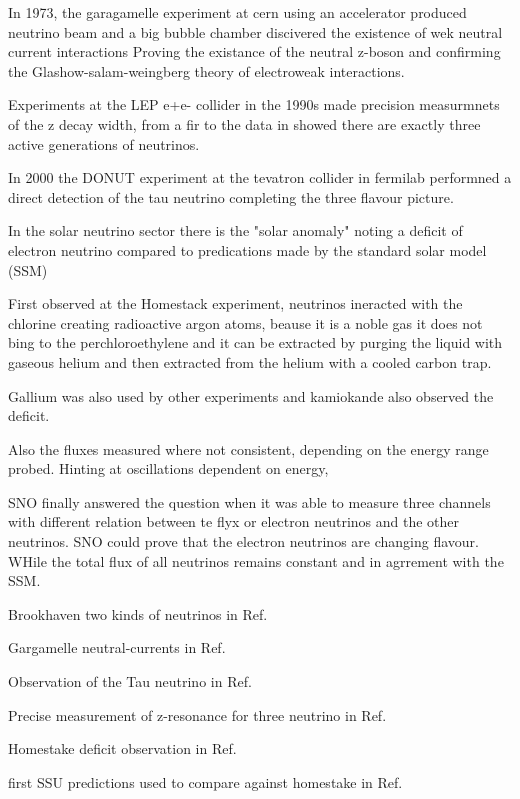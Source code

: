 In 1973, the garagamelle experiment at cern using an accelerator produced neutrino beam and a big bubble chamber discivered the existence of wek neutral current interactions Proving the existance of the neutral z-boson and confirming the Glashow-salam-weingberg theory of electroweak interactions.

Experiments at the LEP e+e- collider in the 1990s made precision measurmnets of the z decay width, from a fir to the data in showed there are exactly three active generations of neutrinos.

In 2000 the DONUT experiment at the tevatron collider in fermilab performned a direct detection of the tau neutrino completing the three flavour picture.

In the solar neutrino sector there is the "solar anomaly" noting a deficit of electron neutrino compared to predications made by the standard solar model (SSM)

First observed at the Homestack experiment, neutrinos ineracted with the chlorine creating radioactive argon atoms, beause it is a noble gas it does not bing to the perchloroethylene and it can be extracted by purging the liquid with gaseous helium and then extracted from the helium with a cooled carbon trap.

Gallium was also used by other experiments and kamiokande also observed the deficit.

Also the fluxes measured where not consistent, depending on the energy range probed. Hinting at oscillations dependent on energy,

SNO finally answered the question when it was able to measure three channels with different relation between te flyx or electron neutrinos and the other neutrinos. SNO could prove that the electron neutrinos are changing flavour. WHile the total flux of all neutrinos remains constant and in agrrement with the SSM.


Brookhaven two kinds of neutrinos in Ref.~\cite{danby1962}

Gargamelle neutral-currents in Ref.~\cite{hasert1974}

Observation of the Tau neutrino in Ref.~\cite{Kodama2001}

Precise measurement of z-resonance for three neutrino in Ref.~\cite{electroweak2006}

Homestake deficit observation in Ref.~\cite{davis1968}

first SSU predictions used to compare against homestake in Ref.~\cite{bahcall1968}

